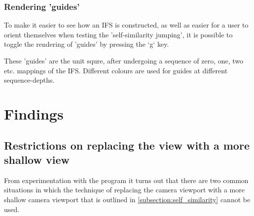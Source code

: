 \documentclass[11pt]{article}
\begin{document}
\subsubsection{Rendering 'guides'}
\label{sec:org8fbf79c}

To make it easier to see how an IFS is constructed, as well as easier for a user to orient themselves when
testing the 'self-similarity jumping', it is possible to toggle the rendering of 'guides' by pressing the `g` key.

These 'guides' are the unit squre, after undergoing a sequence of zero, one, two etc. mappings of the IFS.
Different colours are used for guides at different sequence-depths.


\section{Findings}
\label{sec:org84dd1ac}

\subsection{Restrictions on replacing the view with a more shallow view}
\label{sec:org625e189}

From experimentation with the program it turns out that there are two common situations
in which the technique of replacing the camera viewport with a more shallow camera viewport that is outlined in \autoref{subsection:self_similarity} cannot be used.
\end{document}
